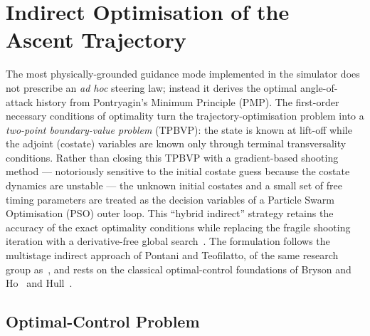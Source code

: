 
\section{Indirect Optimisation of the Ascent Trajectory}
\label{sec:tpbvp}

The most physically-grounded guidance mode implemented in the simulator does not
prescribe an \emph{ad hoc} steering law; instead it derives the optimal
angle-of-attack history from Pontryagin's Minimum Principle (PMP).  The
first-order necessary conditions of optimality turn the trajectory-optimisation
problem into a \emph{two-point boundary-value problem} (TPBVP): the state is
known at lift-off while the adjoint (costate) variables are known only through
terminal transversality conditions.  Rather than closing this TPBVP with a
gradient-based shooting method --- notoriously sensitive to the initial costate
guess because the costate dynamics are unstable --- the unknown initial costates
and a small set of free timing parameters are treated as the decision variables
of a Particle Swarm Optimisation (PSO) outer loop.  This ``hybrid indirect''
strategy retains the accuracy of the exact optimality conditions while replacing
the fragile shooting iteration with a derivative-free global
search~\cite{Pontani2014,PontaniTeofilatto,Betts}.  The formulation follows the
multistage indirect approach of Pontani and Teofilatto, of the same research
group as~\cite{teofilatto2025trajectories}, and rests on the classical
optimal-control foundations of Bryson and Ho~\cite{BrysonHo} and
Hull~\cite{Hull}.

\subsection{Optimal-Control Problem}
\label{ssec:tpbvp_ocp}

